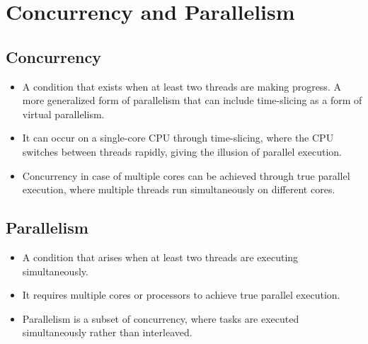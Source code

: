 \documentclass{article}
\begin{document}
\section{Concurrency and Parallelism}
\subsection{Concurrency}
\begin{itemize}
  \item A condition that exists when at least two threads are making progress. A more generalized form of parallelism that can include time-slicing as a form of virtual parallelism.
  \item It can occur on a single-core CPU through time-slicing, where the CPU switches between threads rapidly, giving the illusion of parallel execution.
  \item Concurrency in case of multiple cores can be achieved through true parallel execution, where multiple threads run simultaneously on different cores.
\end{itemize}
\subsection{Parallelism}
\begin{itemize}
  \item A condition that arises when at least two threads are executing simultaneously.
  \item It requires multiple cores or processors to achieve true parallel execution.
  \item Parallelism is a subset of concurrency, where tasks are executed simultaneously rather than interleaved.
\end{itemize}
\newpage
\printindex
\end{document}
